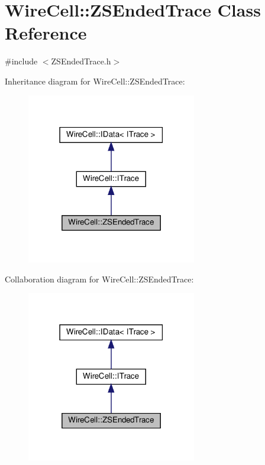 \hypertarget{class_wire_cell_1_1_z_s_ended_trace}{}\section{Wire\+Cell\+:\+:Z\+S\+Ended\+Trace Class Reference}
\label{class_wire_cell_1_1_z_s_ended_trace}


{\ttfamily \#include $<$Z\+S\+Ended\+Trace.\+h$>$}



Inheritance diagram for Wire\+Cell\+:\+:Z\+S\+Ended\+Trace\+:
\nopagebreak
\begin{figure}[H]
\begin{center}
\leavevmode
\includegraphics[width=210pt]{class_wire_cell_1_1_z_s_ended_trace__inherit__graph}
\end{center}
\end{figure}


Collaboration diagram for Wire\+Cell\+:\+:Z\+S\+Ended\+Trace\+:
\nopagebreak
\begin{figure}[H]
\begin{center}
\leavevmode
\includegraphics[width=210pt]{class_wire_cell_1_1_z_s_ended_trace__coll__graph}
\end{center}
\end{figure}
